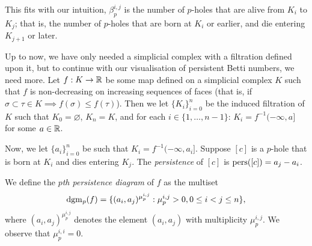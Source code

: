 This fits with our intuition, $\beta_p^{i,j}$ is the number of $p$-holes that are alive from $K_i$ to $K_j$; that is, the number of $p$-holes that are born at $K_i$ or earlier, and die entering $K_{j+1}$ or later. 

Up to now, we have only needed a simplicial complex with a filtration defined upon it, but to continue with our visualisation of persistent Betti numbers, we need more. Let $f: K \to \mathbb{R}$ be some map defined on a simplicial complex $K$ such that $f$ is non-decreasing on increasing sequences of faces (that is, if $\sigma \subset \tau \in K \implies f(\sigma) \leq f(\tau)$). Then we let $\{K_i\}_{i=0}^n$ be the induced filtration of $K$ such that $K_0 = \varnothing$, $K_n = K$, and for each $i \in \{1, \ldots, n-1\}$: $K_i = f^{-1}(-\infty, a]$ for some $a \in \mathbb{R}$. 

Now, we let $\{a_i\}_{i=0}^n$ be such that $K_i = f^{-1}(-\infty, a_i]$. Suppose $[c]$ is a $p$-hole that is born at $K_i$ and dies entering $K_j$. The \emph{persistence} of $[c]$ is $\operatorname*{pers}([c]) = a_j - a_i$.

We define the \emph{$p$th persistence diagram} of $f$ as the multiset
\[ \operatorname*{dgm}{\hspace{-0.15em}}_p(f) = \{(a_i, a_j)^{\mu_p^{i,j}}: \mu_p^{i,j} > 0, 0 \leq i < j \leq n\}, \]
where $(a_i, a_j)^{\mu_p^{i,j}}$ denotes the element $(a_i, a_j)$ with multiplicity $\mu_p^{i,j}$. We observe that $\mu_p^{i,i} = 0$. 
